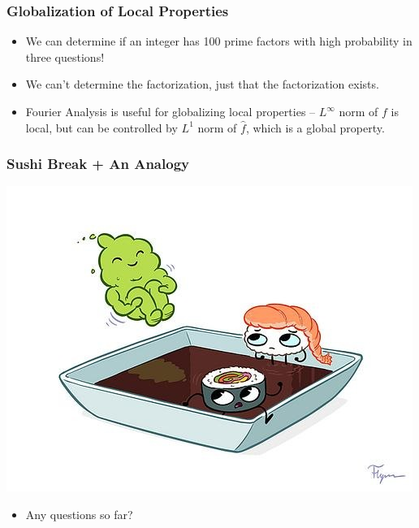 \documentclass{beamer}
\begin{document}
\begin{frame}
    \frametitle{Globalization of Local Properties}

    \begin{itemize}
        \item<1-> We can determine if an integer has 100 prime factors with high probability in three questions!

        \item<2-> We can't determine the factorization, just that the factorization exists.

        \item<3-> Fourier Analysis is useful for globalizing local properties -- $L^\infty$ norm of $f$ is local, but can be controlled by $L^1$ norm of $\hat{f}$, which is a global property.
    \end{itemize}
\end{frame}

\begin{frame}
    \frametitle{Sushi Break + An Analogy}

    \begin{center}
        \includegraphics[scale=0.4]{sushi.jpg}\\
    \end{center}


    \begin{itemize}
        \item Any questions so far?
    \end{itemize}
\end{frame}
\end{document}
